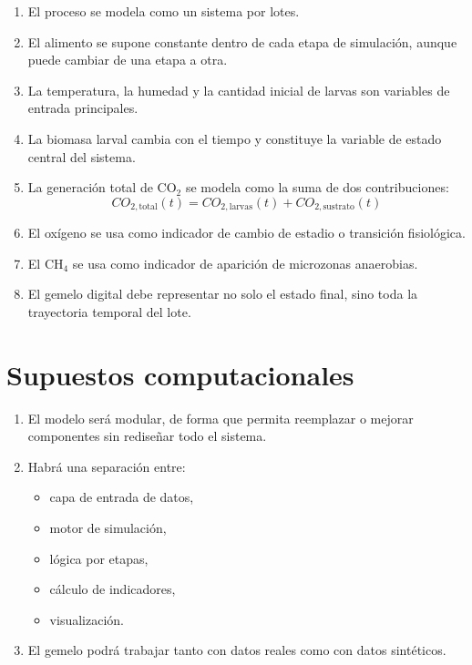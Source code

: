 \documentclass[12pt,a4paper]{report}
\begin{document}
\begin{enumerate}[leftmargin=0.8cm]
    \item El proceso se modela como un sistema por lotes.
    \item El alimento se supone constante dentro de cada etapa de simulación, aunque puede cambiar de una etapa a otra.
    \item La temperatura, la humedad y la cantidad inicial de larvas son variables de entrada principales.
    \item La biomasa larval cambia con el tiempo y constituye la variable de estado central del sistema.
    \item La generación total de CO$_2$ se modela como la suma de dos contribuciones:
    \begin{equation}
        CO_{2,\text{total}}(t) = CO_{2,\text{larvas}}(t) + CO_{2,\text{sustrato}}(t)
    \end{equation}
    \item El oxígeno se usa como indicador de cambio de estadio o transición fisiológica.
    \item El CH$_4$ se usa como indicador de aparición de microzonas anaerobias.
    \item El gemelo digital debe representar no solo el estado final, sino toda la trayectoria temporal del lote.
\end{enumerate}

\section{Supuestos computacionales}

\begin{enumerate}[leftmargin=0.8cm]
    \item El modelo será modular, de forma que permita reemplazar o mejorar componentes sin rediseñar todo el sistema.
    \item Habrá una separación entre:
    \begin{itemize}[leftmargin=0.7cm]
        \item capa de entrada de datos,
        \item motor de simulación,
        \item lógica por etapas,
        \item cálculo de indicadores,
        \item visualización.
    \end{itemize}
    \item El gemelo podrá trabajar tanto con datos reales como con datos sintéticos.
\end{enumerate}
\end{document}
